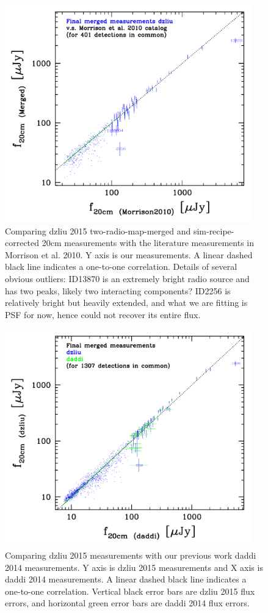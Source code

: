 \documentclass[11pt,a4paper]{article}
\begin{document}
\begin{figure}[H]
	\includegraphics[width=0.95\textwidth]{compare_f20cm_dzliu_with_morrison_2010_20160119}
	\caption{Comparing dzliu 2015 two-radio-map-merged and sim-recipe-corrected 20cm measurements with the literature measurements in Morrison et al. 2010. Y axis is our measurements. A linear dashed black line indicates a one-to-one correlation. Details of several obvious outliers: ID13870 is an extremely bright radio source and has two peaks, likely two interacting components? ID2256 is relatively bright but heavily extended, and what we are fitting is PSF for now, hence could not recover its entire flux.}
\end{figure}

\begin{figure}[H]
	\includegraphics[width=0.95\textwidth]{compare_f20cm_dzliu_with_daddi_20160119}
	\caption{Comparing dzliu 2015 measurements with our previous work daddi 2014 measurements. Y axis is dzliu 2015 measurements and X axis is daddi 2014 measurements. A linear dashed black line indicates a one-to-one correlation. Vertical black error bars are dzliu 2015 flux errors, and horizontal green error bars are daddi 2014 flux errors.}
\end{figure}
\end{document}
